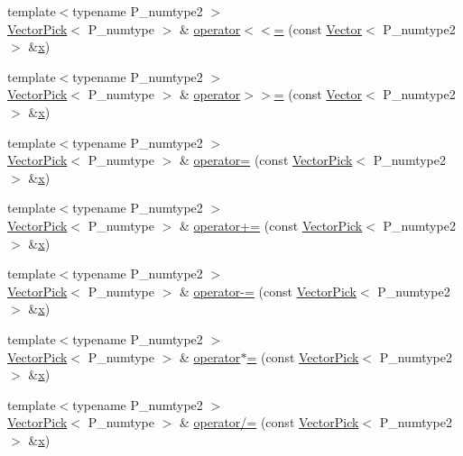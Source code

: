\begin{DoxyCompactItemize}
\item 
{\footnotesize template$<$typename P\+\_\+numtype2 $>$ }\\\hyperlink{classVectorPick}{Vector\+Pick}$<$ P\+\_\+numtype $>$ \& \hyperlink{classVectorPick_abb53482dd0595bd0ad785ee1114568ec}{operator$<$$<$=} (const \hyperlink{classVector}{Vector}$<$ P\+\_\+numtype2 $>$ \&\hyperlink{vecnorm1_8cc_ac73eed9e41ec09d58f112f06c2d6cb63}{x})
\item 
{\footnotesize template$<$typename P\+\_\+numtype2 $>$ }\\\hyperlink{classVectorPick}{Vector\+Pick}$<$ P\+\_\+numtype $>$ \& \hyperlink{classVectorPick_ad38545d64f658eef5c7961cb80807d61}{operator$>$$>$=} (const \hyperlink{classVector}{Vector}$<$ P\+\_\+numtype2 $>$ \&\hyperlink{vecnorm1_8cc_ac73eed9e41ec09d58f112f06c2d6cb63}{x})
\item 
{\footnotesize template$<$typename P\+\_\+numtype2 $>$ }\\\hyperlink{classVectorPick}{Vector\+Pick}$<$ P\+\_\+numtype $>$ \& \hyperlink{classVectorPick_ab065a2b78b4d215ced31c1191426c889}{operator=} (const \hyperlink{classVectorPick}{Vector\+Pick}$<$ P\+\_\+numtype2 $>$ \&\hyperlink{vecnorm1_8cc_ac73eed9e41ec09d58f112f06c2d6cb63}{x})
\item 
{\footnotesize template$<$typename P\+\_\+numtype2 $>$ }\\\hyperlink{classVectorPick}{Vector\+Pick}$<$ P\+\_\+numtype $>$ \& \hyperlink{classVectorPick_a67946910019c78a0f8a4c59d492f2d18}{operator+=} (const \hyperlink{classVectorPick}{Vector\+Pick}$<$ P\+\_\+numtype2 $>$ \&\hyperlink{vecnorm1_8cc_ac73eed9e41ec09d58f112f06c2d6cb63}{x})
\item 
{\footnotesize template$<$typename P\+\_\+numtype2 $>$ }\\\hyperlink{classVectorPick}{Vector\+Pick}$<$ P\+\_\+numtype $>$ \& \hyperlink{classVectorPick_a190d767ac51b91570c11dd5497dc0a33}{operator-\/=} (const \hyperlink{classVectorPick}{Vector\+Pick}$<$ P\+\_\+numtype2 $>$ \&\hyperlink{vecnorm1_8cc_ac73eed9e41ec09d58f112f06c2d6cb63}{x})
\item 
{\footnotesize template$<$typename P\+\_\+numtype2 $>$ }\\\hyperlink{classVectorPick}{Vector\+Pick}$<$ P\+\_\+numtype $>$ \& \hyperlink{classVectorPick_a6a719a56717be92718ee353d0f53f2e2}{operator$\ast$=} (const \hyperlink{classVectorPick}{Vector\+Pick}$<$ P\+\_\+numtype2 $>$ \&\hyperlink{vecnorm1_8cc_ac73eed9e41ec09d58f112f06c2d6cb63}{x})
\item 
{\footnotesize template$<$typename P\+\_\+numtype2 $>$ }\\\hyperlink{classVectorPick}{Vector\+Pick}$<$ P\+\_\+numtype $>$ \& \hyperlink{classVectorPick_a968fd0f8bf9d27435e2cb621b6ab685a}{operator/=} (const \hyperlink{classVectorPick}{Vector\+Pick}$<$ P\+\_\+numtype2 $>$ \&\hyperlink{vecnorm1_8cc_ac73eed9e41ec09d58f112f06c2d6cb63}{x})

\end{DoxyCompactItemize}
